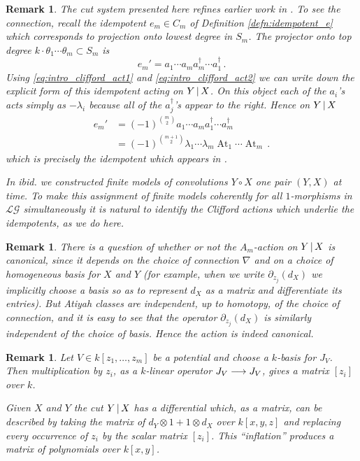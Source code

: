 \documentclass[english,letter paper,12pt,leqno]{article}
\theoremstyle{example}
\newtheorem{remark}[theorem]{Remark}
\numberwithin{equation}{section}
\def\LG{\mathcal{LG}}
\DeclareMathOperator{\At}{At}
\begin{document}
\begin{remark}\label{remark:relation_to_toby_paper} The cut system presented here refines earlier work in \cite{dm1102.2957}. To see the connection, recall the idempotent $e_m \in C_m$ of Definition \ref{defn:idempotent_e} which corresponds to projection onto lowest degree in $S_m$. The projector onto top degree $k \cdot \theta_1 \cdots \theta_m \subset S_m$ is 
\[
e_m' = a_1 \cdots a_m a_m^\dagger \cdots a_1^\dagger\,.
\]
Using \eqref{eq:intro_clifford_act1} and \eqref{eq:intro_clifford_act2} we can write down the explicit form of this idempotent acting on $Y \,|\, X$. On this object each of the $a_i$'s acts simply as $- \lambda_i$ because all of the $a_j^\dagger$'s appear to the right. Hence on $Y \,|\, X$
\begin{align*}
e_m' &= (-1)^{\binom{m}{2}} a_1 \cdots a_m a_1^\dagger \cdots a_m^\dagger \\
&= (-1)^{\binom{m+1}{2}} \lambda_1 \cdots \lambda_m \At_1 \cdots \At_m\,.
\end{align*}
which is precisely the idempotent which appears in \cite[Corollary 10.4]{dm1102.2957}.

In \emph{ibid.} we constructed finite models of convolutions $Y \circ X$ one pair $(Y,X)$ at time. To make this assignment of finite models coherently for all $1$-morphisms in $\LG$ simultaneously it is natural to identify the Clifford actions which underlie the idempotents, as we do here.
\end{remark}

\begin{remark} There is a question of whether or not the $A_m$-action on $Y \,|\, X$ is canonical, since it depends on the choice of connection $\nabla$ and on a choice of homogeneous basis for $X$ and $Y$ (for example, when we write $\partial_{z_j}(d_X)$ we implicitly choose a basis so as to represent $d_X$ as a matrix and differentiate its entries). But Atiyah classes are independent, up to homotopy, of the choice of connection, and it is easy to see that the operator $\partial_{z_j}(d_X)$ is similarly independent of the choice of basis. Hence the action is indeed canonical.
\end{remark}

\begin{remark}\label{remark:inflation} Let $V \in k[z_1,\ldots,z_m]$ be a potential and choose a $k$-basis for $J_V$. Then multiplication by $z_i$, as a $k$-linear operator $J_V \longrightarrow J_V$, gives a matrix $[z_i]$ over $k$. 

Given $X$ and $Y$ the cut $Y \,|\, X$ has a differential which, as a matrix, can be described by taking the matrix of $d_Y \otimes 1 + 1 \otimes d_X$ over $k[x,y,z]$ and replacing every occurrence of $z_i$ by the scalar matrix $[z_i]$. This ``inflation'' produces a matrix of polynomials over $k[x,y]$. 
\end{remark}
\end{document}
